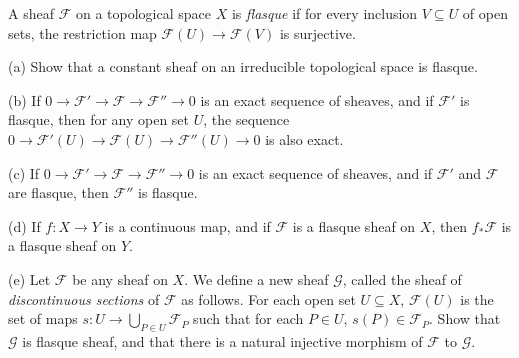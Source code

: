 \begin{exe}
	\label{2.1.16}
	A sheaf $\mathscr{F}$ on a topological space $X$ is \emph{flasque} if for every inclusion $V\subseteq U$ of open sets, the restriction map $ \mathscr{F}(U) \rightarrow  \mathscr{F}(V)$ is surjective.
	
	(a) Show that a constant sheaf on an irreducible topological space is flasque.
	
	(b) If $0 \rightarrow \mathscr{F}' \rightarrow \mathscr{F} \rightarrow \mathscr{F}'' \rightarrow 0$ is an exact sequence of sheaves, and if $\mathscr{F}'$ is flasque, then for any open set $U$, the sequence $0 \rightarrow \mathscr{F}'(U) \rightarrow \mathscr{F}(U) \rightarrow \mathscr{F}''(U) \rightarrow 0$ is also exact.
	
	(c) If $0 \rightarrow \mathscr{F}' \rightarrow \mathscr{F} \rightarrow \mathscr{F}'' \rightarrow 0$ is an exact sequence of sheaves, and if $\mathscr{F}'$ and $\mathscr{F}$ are flasque, then $\mathscr{F}''$ is flasque.
	
	(d) If $f:X \rightarrow Y$ is a continuous map, and if $\mathscr{F}$ is a flasque sheaf on $X$, then $f_*\mathscr{F}$ is a flasque sheaf on $Y$.
	
	(e) Let $\mathscr{F}$ be any sheaf on $X$. We define a new sheaf $\mathscr{G}$, called the sheaf of \emph{discontinuous sections} of $\mathscr{F}$ as follows. For each open set $U\subseteq X$, $\mathscr{F}(U)$ is the set of maps $s: U \rightarrow  \bigcup_{P \in U} \mathscr{F}_{P}$ such that for each ${P \in U}$, ${s(P) \in \mathscr{F}_{P}}$. Show that $\mathscr{G}$ is flasque sheaf, and that there is a natural injective morphism of $\mathscr{F}$ to $\mathscr{G}$.
\end{exe}
